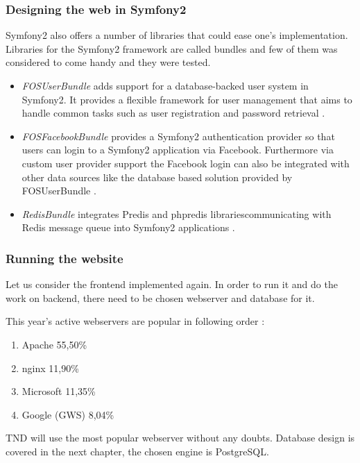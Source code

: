\documentclass[thesis=B,english]{FITthesis}[2013/04/26]
\begin{document}
\subsubsection{Designing the web in Symfony2}

Symfony2 also offers a number of libraries that could ease one's implementation. Libraries for the Symfony2 framework are called bundles \cite{TODO} and few of them was considered to come handy and they were tested.

\begin{itemize}
	\item \emph{FOSUserBundle} adds support for a database-backed user system in Symfony2. It provides a flexible framework for user management that aims to handle common tasks such as user registration and password retrieval \cite{fosuserbundle}.
	\item \emph{FOSFacebookBundle} provides a Symfony2 authentication provider so that users can login to a Symfony2 application via Facebook. Furthermore via custom user provider support the Facebook login can also be integrated with other data sources like the database based solution provided by FOSUserBundle \cite{fosfacebookbundle}.
	\item \emph{RedisBundle} integrates Predis and phpredis librariescommunicating with Redis message queue into Symfony2 applications \cite{redisbundle}.
\end{itemize}


\subsubsection{Running the website}

Let us consider the frontend implemented again. In order to run it and do the work on backend, there need to be chosen webserver and database for it.

This year's active webservers are popular in following order \cite{webserver_usage}:
\begin{enumerate}
	\item Apache 55,50\%
	\item nginx 11,90\%
	\item Microsoft 11,35\%
	\item Google (GWS) 8,04\%
\end{enumerate}

TND will use the most popular webserver without any doubts. Database design is covered in the next chapter, the chosen engine is PostgreSQL.
\end{document}

